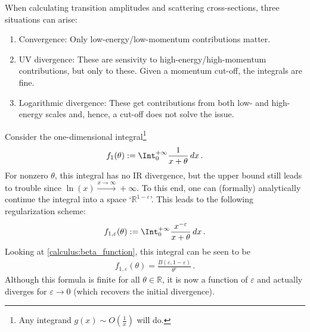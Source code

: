     When calculating transition amplitudes and scattering cross-sections, three situations can arise:
    \begin{enumerate}
        \item Convergence: Only low-energy/low-momentum contributions matter.
        \item UV divergence: These are sensivity to high-energy/high-momentum contributions, but only to these. Given a momentum cut-off, the integrals are fine.
        \item Logarithmic divergence: These get contributions from both low- and high-energy scales and, hence, a cut-off does not solve the issue.
    \end{enumerate}

    Consider the one-dimensional integral\footnote{Any integrand $g(x)\sim O(\frac{1}{x})$ will do.}
    \begin{gather}
        f_1(\theta) := \Int_0^{+\infty}\frac{1}{x+\theta}\,dx\,.
    \end{gather}
    For nonzero $\theta$, this integral has no IR divergence, but the upper bound still leads to trouble since $\ln(x)\xrightarrow{x\longrightarrow\infty}+\infty$. To this end, one can (formally) analytically continue the integral into a space `$\mathbb{R}^{1-\varepsilon}$'. This leads to the following regularization scheme:
    \begin{gather}
        f_{1,\varepsilon}(\theta) := \Int_0^{+\infty}\frac{x^{-\varepsilon}}{x+\theta}\,dx\,.
    \end{gather}
    Looking at \cref{calculus:beta_function}, this integral can be seen to be
    \begin{gather}
        f_{1,\varepsilon}(\theta) = \frac{B(\varepsilon,1-\varepsilon)}{\theta^\varepsilon}\,.
    \end{gather}
    Although this formula is finite for all $\theta\in\mathbb{R}$, it is now a function of $\varepsilon$ and actually diverges for $\varepsilon\longrightarrow0$ (which recovers the initial divergence).

